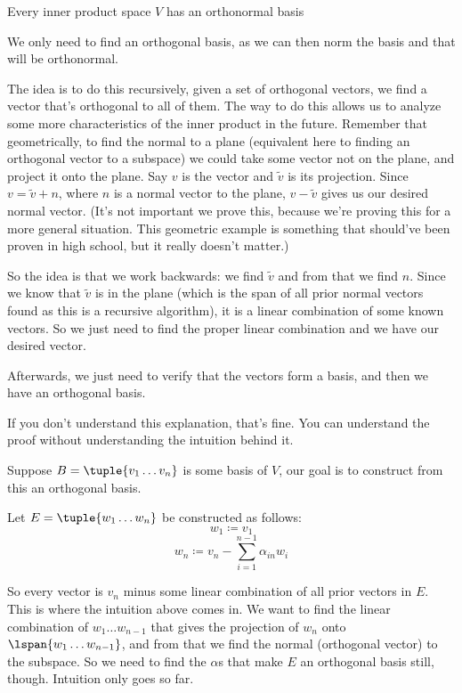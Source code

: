 \documentclass[10pt]{article}
\begin{document}
\begin{theorem}{Every inner product space $V$ has an orthonormal basis}

We only need to find an orthogonal basis, as we can then norm the basis and that will be orthonormal.

The idea is to do this recursively, given a set of orthogonal vectors, we find a vector that's orthogonal to all of them. The way to do this allows us to analyze some more characteristics of the inner product in the future. Remember that geometrically, to find the normal to a plane (equivalent here to finding an orthogonal vector to a subspace) we could take some vector not on the plane, and project it onto the plane. Say $v$ is the vector and $\tilde{v}$ is its projection. Since $v=\tilde{v}+n$, where $n$ is a normal vector to the plane, $v-\tilde{v}$ gives us our desired normal vector. (It's not important we prove this, because we're proving this for a more general situation. This geometric example is something that should've been proven in high school, but it really doesn't matter.)

So the idea is that we work backwards: we find $\tilde{v}$ and from that we find $n$. Since we know that $\tilde{v}$ is in the plane (which is the span of all prior normal vectors found as this is a recursive algorithm), it is a linear combination of some known vectors. So we just need to find the proper linear combination and we have our desired vector.

Afterwards, we just need to verify that the vectors form a basis, and then we have an orthogonal basis.

If you don't understand this explanation, that's fine. You can understand the proof without understanding the intuition behind it.

Suppose $B=\tuple{v_1\dots v_n}$ is some basis of $V$, our goal is to construct from this an orthogonal basis.

Let $E=\tuple{w_1\dots w_n}$ be constructed as follows:
\[ w_1\coloneqq v_1 \]
\[ w_n \coloneqq v_n - \sum_{i=1}^{n-1}\alpha_{in}w_i \]

So every vector is $v_n$ minus some linear combination of all prior vectors in $E$. This is where the intuition above comes in. We want to find the linear combination of $w_1\dots w_{n-1}$ that gives the projection of $w_n$ onto $\lspan{w_1\dots w_{n-1}}$, and from that we find the normal (orthogonal vector) to the subspace. So we need to find the $\alpha$s that make $E$ an orthogonal basis still, though. Intuition only goes so far.


\end{theorem}
\end{document}
